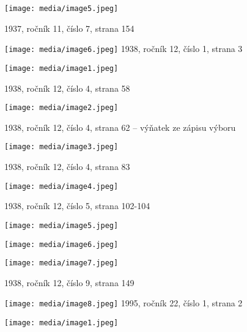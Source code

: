 \texttt{[image: media/image5.jpeg]}

1937, ročník 11, číslo 7, strana 154

\texttt{[image: media/image6.jpeg]}
1938, ročník 12, číslo 1, strana 3

\texttt{[image: media/image1.jpeg]}

1938, ročník 12, číslo 4, strana 58

\texttt{[image: media/image2.jpeg]}

1938, ročník 12, číslo 4, strana 62 -- výňatek ze zápisu výboru

\texttt{[image: media/image3.jpeg]}

1938, ročník 12, číslo 4, strana 83

\texttt{[image: media/image4.jpeg]}

1938, ročník 12, číslo 5, strana 102-104

\texttt{[image: media/image5.jpeg]}

\texttt{[image: media/image6.jpeg]}

\texttt{[image: media/image7.jpeg]}

1938, ročník 12, číslo 9, strana 149

\texttt{[image: media/image8.jpeg]}
1995, ročník 22, číslo 1, strana 2

\texttt{[image: media/image1.jpeg]}
